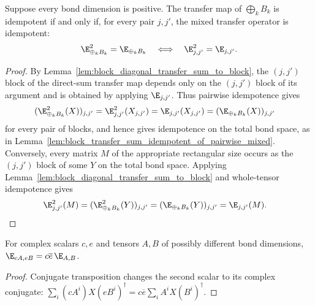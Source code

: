 \begin{lemma}%
    \label{thm:direct_sum_transfer_idempotent_iff_pairwise_mixed}
    \leanok
    Suppose every bond dimension is positive. The transfer map of
    $\bigoplus_k B_k$ is idempotent if and only if, for every pair $j,j'$,
    the mixed transfer operator is idempotent:
    \begin{align}
        \E_{\oplus_k B_k}^2=\E_{\oplus_k B_k}
        \quad\Longleftrightarrow\quad
        \E_{j,j'}^2=\E_{j,j'}.
        \notag
    \end{align}
\end{lemma}
\begin{proof}\leanok
    By Lemma~\ref{lem:block_diagonal_transfer_sum_to_block}, the $(j,j')$
    block of the direct-sum transfer map depends only on the $(j,j')$ block of
    its argument and is obtained by applying $\E_{j,j'}$. Thus pairwise
    idempotence gives
    \begin{align}
        (\E_{\oplus_k B_k}^2(X))_{j,j'}
         & = \E_{j,j'}^2(X_{j,j'})
        = \E_{j,j'}(X_{j,j'})
        = (\E_{\oplus_k B_k}(X))_{j,j'}
        \notag
    \end{align}
    for every pair of blocks, and hence gives idempotence on the total bond
    space, as in
    Lemma~\ref{lem:block_transfer_sum_idempotent_of_pairwise_mixed}.
    Conversely, every matrix $M$ of the appropriate rectangular size occurs as
    the $(j,j')$ block of some $Y$ on the total bond space. Applying
    Lemma~\ref{lem:block_diagonal_transfer_sum_to_block} and whole-tensor
    idempotence gives
    \begin{align}
        \E_{j,j'}^2(M)
         & = (\E_{\oplus_k B_k}^2(Y))_{j,j'}
        = (\E_{\oplus_k B_k}(Y))_{j,j'}
        = \E_{j,j'}(M).
        \notag
    \end{align}
\end{proof}

\begin{lemma}%
    \label{lem:mixed_transfer_rect_smul}
    \leanok
    For complex scalars $c,e$ and tensors $A,B$ of possibly different bond
    dimensions, $\E_{cA,eB}=c\overline e\,\E_{A,B}$.
\end{lemma}
\begin{proof}\leanok
    Conjugate transposition changes the second scalar to its complex conjugate:
    $\sum_i(cA^i)X(eB^i)^\dagger
        =c\overline e\sum_iA^iX(B^i)^\dagger$.
\end{proof}

